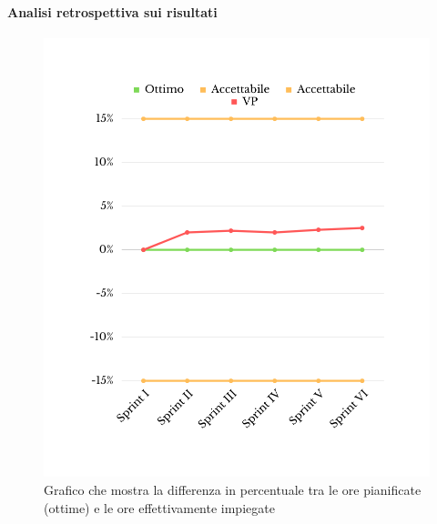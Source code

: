 \paragraph{Analisi retrospettiva sui risultati}
\begin{figure}[H]
	\centering
	\includegraphics[scale=0.5]{img/SV.png}
	\caption{Grafico che mostra la differenza in percentuale tra le ore pianificate (ottime) e le ore effettivamente impiegate}
\end{figure}
